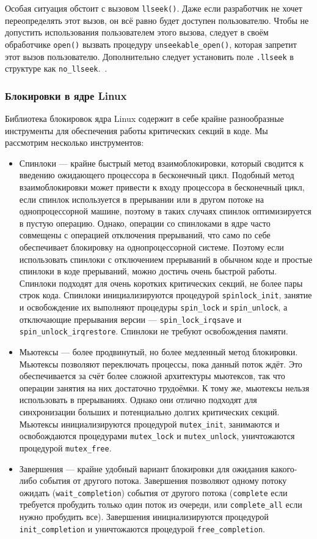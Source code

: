 \documentclass[a4paper,12pt]{report}
\numberwithin{equation}{section}
\begin{document}
Особая ситуация обстоит с вызовом \texttt{llseek()}. Даже если разработчик не
хочет переопределять этот вызов, он всё равно будет доступен пользователю. Чтобы
не допустить использования пользователем этого вызова, следует в своём
обработчике \texttt{open()} вызвать процедуру \texttt{unseekable\_open()},
которая запретит этот вызов пользователю. Дополнительно следует установить поле
\texttt{.llseek} в структуре как \texttt{no\_llseek}.~\cite{corbet2009linux}.

\subsubsection{Блокировки в ядре Linux}
Библиотека блокировок ядра Linux содержит в себе крайне разнообразные
инструменты для обеспечения работы критических секций в коде. Мы рассмотрим
несколько инструментов:
\begin{itemize}
\item Спинлоки --- крайне быстрый метод взаимоблокировки, который сводится к
  введению ожидающего процессора в бесконечный цикл. Подобный метод
  взаимоблокировки может привести к входу процессора в бесконечный цикл, если
  спинлок используется в прерывании или в другом потоке на однопроцессорной
  машине, поэтому в таких случаях спинлок оптимизируется в пустую
  операцию. Однако, операции со спинлоками в ядре часто совмещены с операцией
  отключения прерываний, что само по себе обеспечивает блокировку на
  однопроцессорной системе. Поэтому если использовать спинлоки с отключением
  прерываний в обычном коде и простые спинлоки в коде прерываний, можно достичь
  очень быстрой работы. Спинлоки подходят для очень коротких критических секций,
  не более пары строк кода. Спинлоки инициализируются процедурой
  \texttt{spinlock\_init}, занятие и освобождение их выполняют процедуры
  \texttt{spin\_lock} и \texttt{spin\_unlock}, а отключающие прерывания версии ---
  \texttt{spin\_lock\_irqsave} и \texttt{spin\_unlock\_irqrestore}. Спинлоки не
  требуют освобождения памяти.
\item Мьютексы --- более продвинутый, но более медленный метод
  блокировки. Мьютексы позволяют переключать процессы, пока данный поток
  ждёт. Это обеспечивается за счёт более сложной архитектуры мьютексов, так что
  операции занятия на них достаточно трудоёмки. К тому же, мьютексы нельзя
  использовать в прерываниях. Однако они отлично подходят для синхронизации
  больших и потенциально долгих критических секций. Мьютексы инициализируются
  процедурой \texttt{mutex\_init}, занимаются и освобождаются процедурами
  \texttt{mutex\_lock} и \texttt{mutex\_unlock}, уничтожаются процедурой
  \texttt{mutex\_free}.
\item Завершения --- крайне удобный вариант блокировки для ожидания какого-либо
  события от другого потока. Завершения позволяют одному потоку ожидать
  (\texttt{wait\_completion}) события от другого потока (\texttt{complete} если
  требуется пробудить только один поток из очереди, или \texttt{complete\_all}
  если нужно пробудить все). Завершения инициализируются процедурой
  \texttt{init\_completion} и уничтожаются процедурой \texttt{free\_completion}.
\end{itemize}
\end{document}
